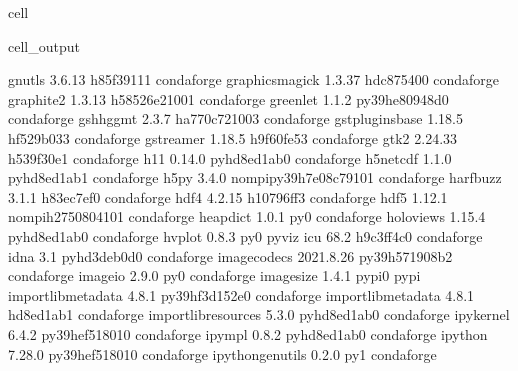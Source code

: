 \documentclass[letterpaper,table,10pt,english]{jupyterBook}
\begin{document}
\begin{sphinxuseclass}{cell}
\begin{sphinxVerbatimOutput}
\begin{sphinxuseclass}{cell_output}
\begin{sphinxVerbatim}[commandchars=\\\{\}]
gnutls                    3.6.13               h85f3911\PYGZus{}1    conda\PYGZhy{}forge
graphicsmagick            1.3.37               hdc87540\PYGZus{}0    conda\PYGZhy{}forge
graphite2                 1.3.13            h58526e2\PYGZus{}1001    conda\PYGZhy{}forge
greenlet                  1.1.2            py39he80948d\PYGZus{}0    conda\PYGZhy{}forge
gshhg\PYGZhy{}gmt                 2.3.7             ha770c72\PYGZus{}1003    conda\PYGZhy{}forge
gst\PYGZhy{}plugins\PYGZhy{}base          1.18.5               hf529b03\PYGZus{}3    conda\PYGZhy{}forge
gstreamer                 1.18.5               h9f60fe5\PYGZus{}3    conda\PYGZhy{}forge
gtk2                      2.24.33              h539f30e\PYGZus{}1    conda\PYGZhy{}forge
h11                       0.14.0             pyhd8ed1ab\PYGZus{}0    conda\PYGZhy{}forge
h5netcdf                  1.1.0              pyhd8ed1ab\PYGZus{}1    conda\PYGZhy{}forge
h5py                      3.4.0           nompi\PYGZus{}py39h7e08c79\PYGZus{}101    conda\PYGZhy{}forge
harfbuzz                  3.1.1                h83ec7ef\PYGZus{}0    conda\PYGZhy{}forge
hdf4                      4.2.15               h10796ff\PYGZus{}3    conda\PYGZhy{}forge
hdf5                      1.12.1          nompi\PYGZus{}h2750804\PYGZus{}101    conda\PYGZhy{}forge
heapdict                  1.0.1                      py\PYGZus{}0    conda\PYGZhy{}forge
holoviews                 1.15.4             pyhd8ed1ab\PYGZus{}0    conda\PYGZhy{}forge
hvplot                    0.8.3                      py\PYGZus{}0    pyviz
icu                       68.2                 h9c3ff4c\PYGZus{}0    conda\PYGZhy{}forge
idna                      3.1                pyhd3deb0d\PYGZus{}0    conda\PYGZhy{}forge
imagecodecs               2021.8.26        py39h571908b\PYGZus{}2    conda\PYGZhy{}forge
imageio                   2.9.0                      py\PYGZus{}0    conda\PYGZhy{}forge
imagesize                 1.4.1                    pypi\PYGZus{}0    pypi
importlib\PYGZhy{}metadata        4.8.1            py39hf3d152e\PYGZus{}0    conda\PYGZhy{}forge
importlib\PYGZus{}metadata        4.8.1                hd8ed1ab\PYGZus{}1    conda\PYGZhy{}forge
importlib\PYGZus{}resources       5.3.0              pyhd8ed1ab\PYGZus{}0    conda\PYGZhy{}forge
ipykernel                 6.4.2            py39hef51801\PYGZus{}0    conda\PYGZhy{}forge
ipympl                    0.8.2              pyhd8ed1ab\PYGZus{}0    conda\PYGZhy{}forge
ipython                   7.28.0           py39hef51801\PYGZus{}0    conda\PYGZhy{}forge
ipython\PYGZus{}genutils          0.2.0                      py\PYGZus{}1    conda\PYGZhy{}forge

\end{sphinxVerbatim}
\end{sphinxuseclass}
\end{sphinxVerbatimOutput}
\end{sphinxuseclass}
\end{document}
